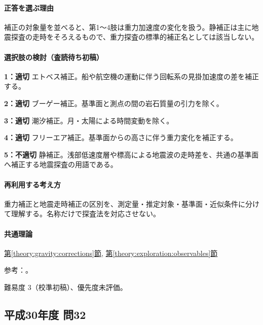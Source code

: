 \paragraph{正答を選ぶ理由} 補正の対象量を並べると、第1〜4肢は重力加速度の変化を扱う。静補正は主に地震探査の走時をそろえるもので、重力探査の標準的補正名としては該当しない。

\paragraph{選択肢の検討（査読待ち初稿）}\mbox{}\par

\noindent\textbf{1：適切} エトベス補正。船や航空機の運動に伴う回転系の見掛加速度の差を補正する。\par

\noindent\textbf{2：適切} ブーゲー補正。基準面と測点の間の岩石質量の引力を除く。\par

\noindent\textbf{3：適切} 潮汐補正。月・太陽による時間変動を除く。\par

\noindent\textbf{4：適切} フリーエア補正。基準面からの高さに伴う重力変化を補正する。\par

\noindent\textbf{5：不適切} 静補正。浅部低速度層や標高による地震波の走時差を、共通の基準面へ補正する地震探査の用語である。\par

\paragraph{再利用する考え方} 重力補正と地震走時補正の区別を、測定量・推定対象・基準面・近似条件に分けて理解する。名称だけで探査法を対応させない。

\paragraph{共通理論} \hyperref[theory:gravity:corrections]{第\ref*{theory:gravity:corrections}節}, \hyperref[theory:exploration:observables]{第\ref*{theory:exploration:observables}節}

\par 参考：\cite{gsi_gravity_definitions}。

\par 難易度 3（校準初稿）、優先度未評価。

\subsection{平成30年度 問32}
\label{q:h30-reg-applied-32}

